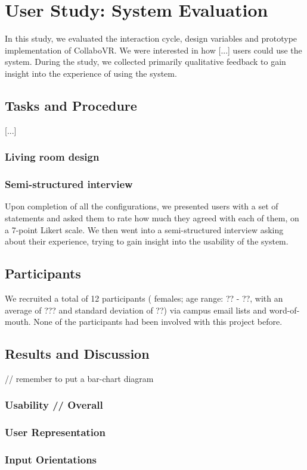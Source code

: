 \documentclass{sigchi}
\begin{document}
\section{User Study: System Evaluation}
In this study, we evaluated the interaction cycle, design variables and prototype implementation of CollaboVR. We were interested in how [...] users could use the system. During the study, we collected primarily qualitative feedback to gain insight into the experience of using the system.
\subsection{Tasks and Procedure}
[...]
\subsubsection{Living room design}
\subsubsection{Semi-structured interview}
Upon completion of all the configurations, we presented users with a set of statements and asked them to rate how much they agreed with each of them, on a 7-point Likert scale. We then went into a semi-structured interview asking about their experience, trying to gain insight into the usability of the system.
\subsection{Participants}
We recruited a total of 12 participants ( females; age range: ?? - ??, with an average of ??? and standard deviation of ??) via campus email lists and word-of-mouth. None of the participants had been involved with this project before.

\subsection{Results and Discussion} 
// remember to put a bar-chart diagram
\subsubsection{Usability // Overall}
\subsubsection{User Representation}
\subsubsection{Input Orientations}
\end{document}
